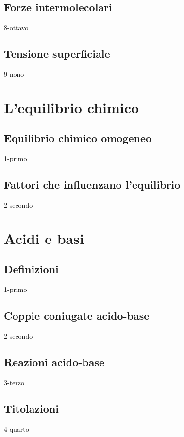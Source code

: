 \documentclass[openany,12pt]{book}%
\begin{document}
\newpage

\section{Forze intermolecolari}
{8-ottavo}

\section{Tensione superficiale}
{9-nono}

\chapter{L'equilibrio chimico}

\section{Equilibrio chimico omogeneo}
{1-primo}

\section{Fattori che influenzano l'equilibrio}
{2-secondo}

\chapter{Acidi e basi}

\section{Definizioni}
{1-primo}

\section{Coppie coniugate acido-base}
{2-secondo}

\section{Reazioni acido-base}
{3-terzo}

\newpage

\section{Titolazioni}
{4-quarto}
\end{document}
